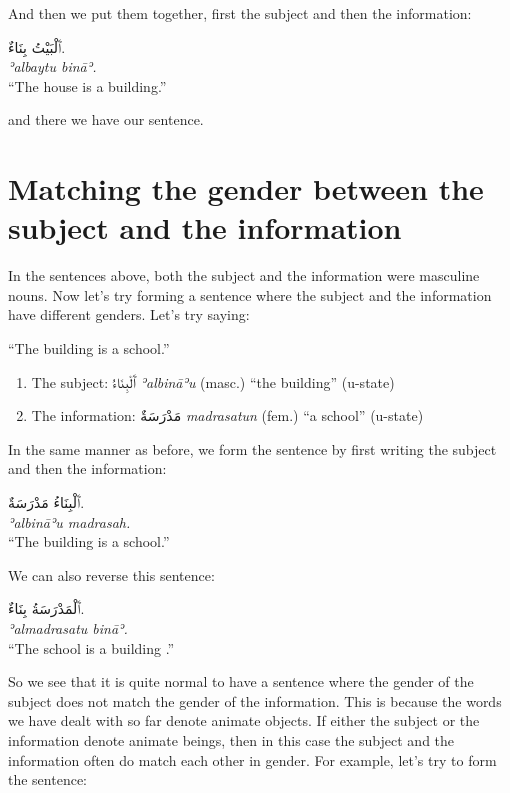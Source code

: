 \documentclass[
  10pt,
]{book}
\providecommand{\tightlist}{%
  \setlength{\itemsep}{0pt}\setlength{\parskip}{0pt}}
\begin{document}
And then we put them together, first the subject and then the information:

\foreignlanguage{arabic}{ٱَلْبَيْتُ بِنَاءٌ.}\\
\emph{ʾalbaytu bināʾ.}\\
\enquote{The house is a building.}

and there we have our sentence.

\section{Matching the gender between the subject and the information}\label{matching-the-gender-between-the-subject-and-the-information}

In the sentences above, both the subject and the information were masculine nouns. Now let's try forming a sentence where the subject and the information have different genders. Let's try saying:

\enquote{The building is a school.}

\begin{enumerate}
\def\labelenumi{\roman{enumi}.}
\tightlist
\item
  The subject: \foreignlanguage{arabic}{ٱَلْبِنَاءُ} \emph{ʾalbināʾu} (masc.) \enquote{the building} (u-state)
\item
  The information: \foreignlanguage{arabic}{مَدْرَسَةٌ} \emph{madrasatun} (fem.) \enquote{a school} (u-state)
\end{enumerate}

In the same manner as before, we form the sentence by first writing the subject and then the information:

\foreignlanguage{arabic}{ٱَلْبِنَاءُ مَدْرَسَةٌ.}\\
\emph{ʾalbināʾu madrasah.}\\
\enquote{The building is a school.}

We can also reverse this sentence:

\foreignlanguage{arabic}{ٱَلْمَدْرَسَةُ بِنَاءٌ.}\\
\emph{ʾalmadrasatu bināʾ.}\\
\enquote{The school is a building .}

So we see that it is quite normal to have a sentence where the gender of the subject does not match the gender of the information.
This is because the words we have dealt with so far denote animate objects.
If either the subject or the information denote animate beings, then in this case the subject and the information often do match each other in gender. For example, let's try to form the sentence:
\end{document}
